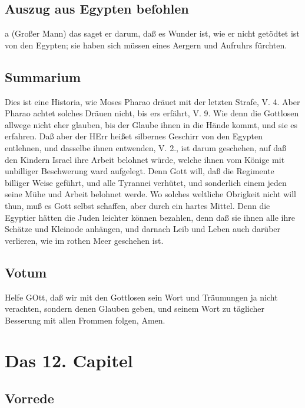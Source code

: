 \section{Auszug aus Egypten befohlen}

a (Großer Mann) das saget er darum, daß es Wunder ist, wie er nicht getödtet ist von den Egypten; sie haben sich müssen eines Aergern und Aufruhrs fürchten.

\section{Summarium}

Dies ist eine Historia, wie Moses Pharao dräuet mit der letzten Strafe, V. 4. Aber Pharao achtet solches Dräuen nicht, bis ers erfährt, V. 9. Wie denn die Gottlosen allwege nicht eher glauben, bis der Glaube ihnen in die Hände kommt, und sie es erfahren. Daß aber der HErr heißet silbernes Geschirr von den Egypten entlehnen, und dasselbe ihnen entwenden, V. 2., ist darum geschehen, auf daß den Kindern Israel ihre Arbeit belohnet würde, welche ihnen vom Könige mit unbilliger Beschwerung ward aufgelegt. Denn Gott will, daß die Regimente billiger Weise geführt, und alle Tyrannei verhütet, und sonderlich einem jeden seine Mühe und Arbeit belohnet werde. Wo solches weltliche Obrigkeit nicht will thun, muß es Gott selbst schaffen, aber durch ein hartes Mittel. Denn die Egyptier hätten die Juden leichter können bezahlen, denn daß sie ihnen alle ihre Schätze und Kleinode anhängen, und darnach Leib und Leben auch darüber verlieren, wie im rothen Meer geschehen ist.



\section{Votum}

Helfe GOtt, daß wir mit den Gottlosen sein Wort und Träumungen ja nicht verachten, sondern denen Glauben geben, und seinem Wort zu täglicher Besserung mit allen Frommen folgen, Amen.

\chapter{Das 12. Capitel}

\section{Vorrede}

